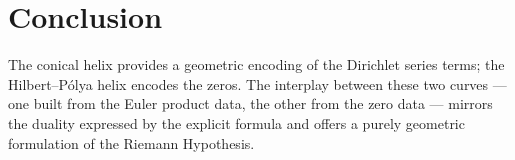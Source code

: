 \documentclass[12pt,a4paper]{article}
\begin{document}
\section{Conclusion}
The conical helix provides a geometric encoding of the Dirichlet series terms; the Hilbert--P\'olya helix encodes the zeros.  The interplay between these two curves — one built from the Euler product data, the other from the zero data — mirrors the duality expressed by the explicit formula and offers a purely geometric formulation of the Riemann Hypothesis.
\end{document}
